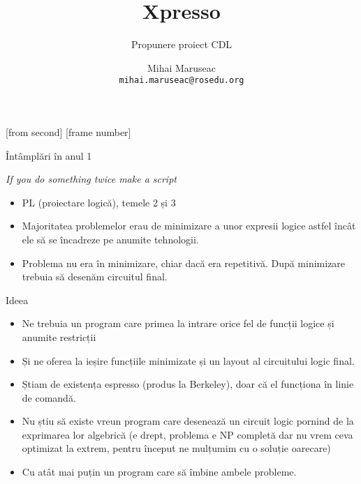 \documentclass{beamer}
\title{Xpresso}
\subtitle{Propunere proiect CDL}
\institute{ROSEdu}
\author{Mihai Maruseac \\ \texttt{mihai.maruseac@rosedu.org}}
\begin{document}
[from second]
[frame number]

\frame{\titlepage}

\begin{frame}{Întâmplări în anul 1}
\begin{center}\textit{If you do something twice make a script}\end{center}
\begin{itemize}
\item \pause PL (proiectare logică), temele 2 și 3
\item \pause Majoritatea problemelor erau de minimizare a unor expresii logice astfel încât ele să se încadreze pe anumite tehnologii.
\item \pause Problema nu era în minimizare, chiar dacă era repetitivă. \pause După minimizare trebuia să desenăm circuitul final.
\end{itemize}
\end{frame}

\begin{frame}{Ideea}
\begin{itemize}
\item Ne trebuia un program care primea la intrare orice fel de funcții logice și anumite restricții
\item \pause Și ne oferea la ieșire funcțiile minimizate și un layout al circuitului logic final.
\item \pause Știam de existența espresso (produs la Berkeley), doar că el funcționa în linie de comandă.
\item \pause Nu știu să existe vreun program care desenează un circuit logic pornind de la exprimarea lor algebrică \pause(e drept, problema e NP completă dar nu vrem ceva optimizat la extrem, pentru început ne mulțumim cu o soluție oarecare)
\item \pause Cu atât mai puțin un program care să îmbine ambele probleme.
\end{itemize}
\end{frame}
\end{document}

